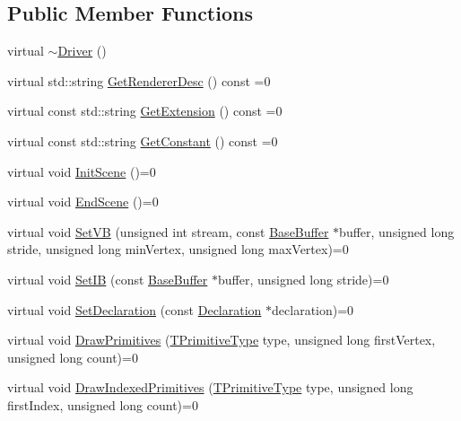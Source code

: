 \subsection*{Public Member Functions}
\begin{DoxyCompactItemize}
\item 
virtual \hyperlink{class_agmd_1_1_driver_acd6fcffe1c271f55b8b5c0b89c540f53}{$\sim$\+Driver} ()
\item 
virtual std\+::string \hyperlink{class_agmd_1_1_driver_a35c8501ea4154ef1f9dfd6dfb04d6b7d}{Get\+Renderer\+Desc} () const =0
\item 
virtual const std\+::string \hyperlink{class_agmd_1_1_driver_a57ef5797a34bc3f9ed10fd05c319c155}{Get\+Extension} () const =0
\item 
virtual const std\+::string \hyperlink{class_agmd_1_1_driver_a16e778a171f2e45f55b3ab6391db69d6}{Get\+Constant} () const =0
\item 
virtual void \hyperlink{class_agmd_1_1_driver_aff07d992edd330c24c177b4532f93218}{Init\+Scene} ()=0
\item 
virtual void \hyperlink{class_agmd_1_1_driver_a0616e055795e47e62fb71cce5c85c38a}{End\+Scene} ()=0
\item 
virtual void \hyperlink{class_agmd_1_1_driver_a54fa3d9aa9b5c3175bc2f4fc487f38fd}{Set\+V\+B} (unsigned int stream, const \hyperlink{class_agmd_1_1_base_buffer}{Base\+Buffer} $\ast$buffer, unsigned long stride, unsigned long min\+Vertex, unsigned long max\+Vertex)=0
\item 
virtual void \hyperlink{class_agmd_1_1_driver_adee1250e06ad2ac3d97a839076a52941}{Set\+I\+B} (const \hyperlink{class_agmd_1_1_base_buffer}{Base\+Buffer} $\ast$buffer, unsigned long stride)=0
\item 
virtual void \hyperlink{class_agmd_1_1_driver_a302ea30a784d1eadd3f317f33a86ca71}{Set\+Declaration} (const \hyperlink{class_agmd_1_1_declaration}{Declaration} $\ast$declaration)=0
\item 
virtual void \hyperlink{class_agmd_1_1_driver_a17c73e5ff37f4da7cb16b63f2d1ffa1c}{Draw\+Primitives} (\hyperlink{namespace_agmd_a0e38d0c34891ddd6eef72e1c9e55161c}{T\+Primitive\+Type} type, unsigned long first\+Vertex, unsigned long count)=0
\item 
virtual void \hyperlink{class_agmd_1_1_driver_a602d935335e7601b5fe2b74fe57d3547}{Draw\+Indexed\+Primitives} (\hyperlink{namespace_agmd_a0e38d0c34891ddd6eef72e1c9e55161c}{T\+Primitive\+Type} type, unsigned long first\+Index, unsigned long count)=0
\item 

\end{DoxyCompactItemize}
